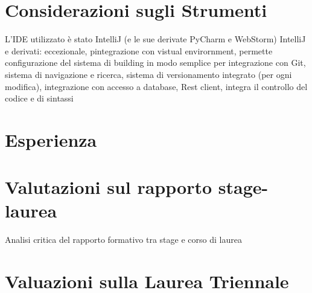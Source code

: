 \section{Considerazioni sugli Strumenti}
	L'IDE utilizzato è stato IntelliJ (e le sue derivate PyCharm e WebStorm)
	IntelliJ e derivati: eccezionale, pintegrazione con vistual envirornment, permette configurazione del sistema di building in modo semplice
	per integrazione con Git, sistema di navigazione e ricerca, sistema di versionamento integrato (per ogni modifica), integrazione con accesso a database, Rest client, integra il controllo del codice e di sintassi

\section{Esperienza}

\section{Valutazioni sul rapporto stage-laurea}
Analisi critica del rapporto formativo tra stage e corso di laurea

\section{Valuazioni sulla Laurea Triennale}
